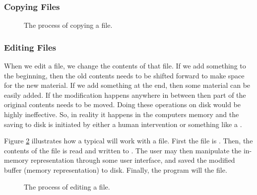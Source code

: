 \subsubsection{Copying Files}



\begin{figure}[tbp]
  
  \caption{The process of copying a file.}
  \label{fig:bg:processes:copy}
\end{figure}

\subsubsection{Editing Files}

When we edit a file, we change the contents of that file. If we add something to the beginning, then the old contents needs to be shifted forward to make space for the new material. If we add something at the end, then some material can be easily added. If the modification happens anywhere in between then part of the original contents needs to be moved. Doing these operations on disk would be highly ineffective. So, in reality it happens in the computers memory and the saving to disk is initiated by either a human intervention or something like a .

Figure \ref{fig:bg:processes:edit} illustrates how a typical  will work with a file. First the file is . Then, the contents of the file is read and written to . The user may then manipulate the in-memory representation through some user interface, and saved the modified buffer (memory representation) to disk. Finally, the program will  the file.

\begin{figure}[tbp]
  
  \caption{The process of editing a file.}
  \label{fig:bg:processes:edit}
\end{figure}

